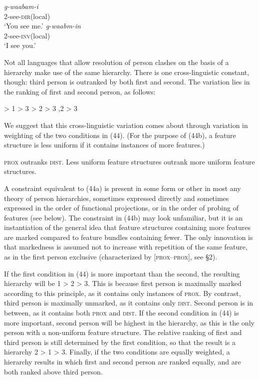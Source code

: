 \documentclass[output=paper]{langsci/langscibook}
\begin{document}
\ea 
  \ea
 \gll     \textit{g-waabam-i}      \\
           \textsc{2}-see-\textsc{dir}(local)  \\
 \glt      ‘You see me.’
 \ex
   \gll  \textit{g-waabm-in}\\
         \textsc{2}-see-\textsc{inv}(local)\\
   \glt   ‘I see you.’
\z
  \z

Not all languages that allow resolution of person clashes on the basis of a hierarchy make use of the same hierarchy. There is one cross-linguistic constant, though: third person is outranked by both first and second. The variation lies in the ranking of first and second person, as follows:

\ea \settowidth{}
 > 1 > 3  
 > 2 > 3  
,2 > 3    
\z
\z
{}

We suggest that this cross-linguistic variation comes about through variation in weighting of the two conditions in (44). (For the purpose of (44b), a feature structure is less uniform if it contains instances of more features.)

\ea \label{bkm:Ref453928502}  
\ea  \textsc{prox} outranks \textsc{dist}.
\ex  Less uniform feature structures outrank more uniform feature structures.
\z
\z

A constraint equivalent to (44a) is present in some form or other in most any theory of person hierarchies, sometimes expressed directly and sometimes expressed in the order of functional projections, or in the order of probing of features (see below). The constraint in (44b) may look unfamiliar, but it is an instantiation of the general idea that feature structures containing more features are marked compared to feature bundles containing fewer. The only innovation is that markedness is assumed not to increase with repetition of the same feature, as in the first person exclusive (characterized by [\textsc{prox}–\textsc{prox}], see §2).

If the first condition in (44) is more important than the second, the resulting hierarchy will be 1 > 2 > 3. This is because first person is maximally marked according to this principle, as it contains only instances of \textsc{prox}. By contrast, third person is maximally unmarked, as it contains only \textsc{dist}. Second person is in between, as it contains both \textsc{prox} and \textsc{dist}. If the second condition in (44) is more important, second person will be highest in the hierarchy, as this is the only person with a non-uniform feature structure. The relative ranking of first and third person is still determined by the first condition, so that the result is a hierarchy 2 > 1 > 3. Finally, if the two conditions are equally weighted, a hierarchy results in which first and second person are ranked equally, and are both ranked above third person.
\end{document}
